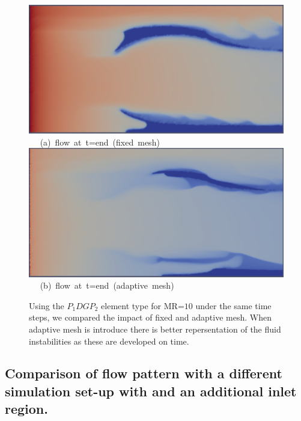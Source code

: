 \documentclass[preprint,authoryear,12pt]{elsarticle}
\begin{document}
\begin{figure}[h]
\vbox{
\hbox{\hspace{3.5cm}
\includegraphics[width=.5\textwidth]{./Pics1/mr10_5regions_fixed/5regions_fixed_2000.pdf} 
}
\vspace{0.0cm}
\hbox{\hspace{5.0cm} (a) flow at t=end (fixed mesh)   
}
\vspace{0.25cm}
\hbox{\hspace{3.5cm}
\includegraphics[width=.5\textwidth]{./Pics1/mr10_5regions_adapt/5regions_adapt_3000.pdf}
}
\vspace{0.0cm}
\hbox{\hspace{5.0cm} (b) flow at t=end (adaptive mesh)     
}
}     
\caption{Using the $P_{1}DGP_{2}$ element type for MR=$10$ under the same time steps, we compared the impact of fixed and adaptive mesh. When adaptive mesh is introduce there is better repersentation of the fluid instabilities as these are developed on time.}
\label{fig:2testcase_d}
\end{figure}


\subsection{Comparison of flow pattern with a different simulation set-up with and an additional inlet region.}
\end{document}
